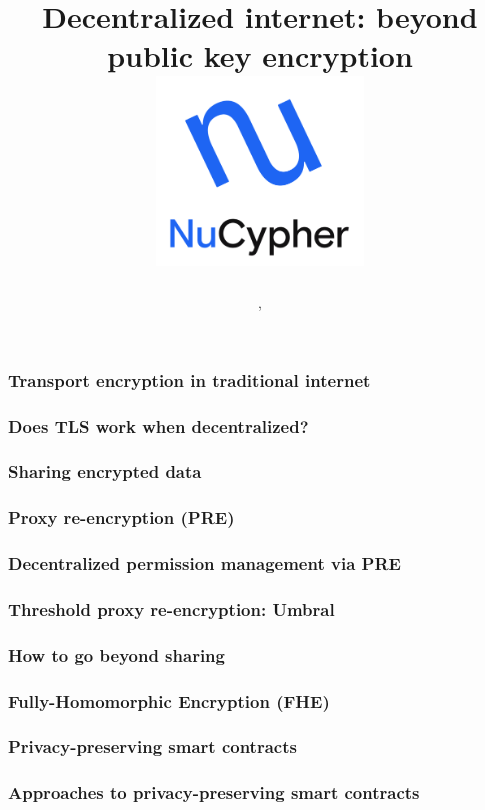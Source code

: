 \documentclass[xetex,mathsans,sans,aspectratio=169]{beamer}
\title[\titlefooter]{Decentralized internet: beyond public key encryption
\includegraphics[width=5.5cm]{pdf/nucypher_logo.pdf}}
\author[\presenterfooter]{\presenter}
\date[\eventdate]{\event, \eventdate}
\begin{document}
    \begin{frame}
        \titlepage
    \end{frame}

    \begin{frame}
        \frametitle{Transport encryption in traditional internet}
    \end{frame}

    \begin{frame}
        \frametitle{Does TLS work when decentralized?}
    \end{frame}

    \begin{frame}
        \frametitle{Sharing encrypted data}
    \end{frame}

    \begin{frame}
        \frametitle{Proxy re-encryption (PRE)}
    \end{frame}

    \begin{frame}
        \frametitle{Decentralized permission management via PRE}
    \end{frame}

    \begin{frame}
        \frametitle{Threshold proxy re-encryption: Umbral}
    \end{frame}

    \begin{frame}
        \frametitle{How to go beyond sharing}
    \end{frame}

    \begin{frame}
        \frametitle{Fully-Homomorphic Encryption (FHE)}
    \end{frame}

    \begin{frame}
        \frametitle{Privacy-preserving smart contracts}
    \end{frame}

    \begin{frame}
        \frametitle{Approaches to privacy-preserving smart contracts}
    \end{frame}
\end{document}
